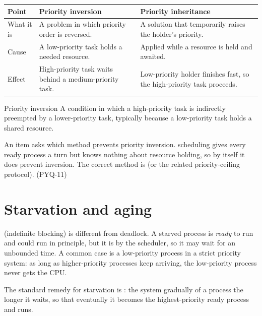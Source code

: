 \begin{center}
\begin{tabular}{p{}p{}p{}}
\toprule
\textbf{Point} & \textbf{Priority inversion} & \textbf{Priority inheritance} \\
\midrule
What it is & A problem in which priority order is reversed. & A solution that temporarily raises the holder's priority. \\
Cause & A low-priority task holds a needed resource. & Applied while a resource is held and awaited. \\
Effect & High-priority task waits behind a medium-priority task. & Low-priority holder finishes fast, so the high-priority task proceeds. \\
\bottomrule
\end{tabular}
\end{center}

\begin{definitionbox}{Priority inversion}
A condition in which a high-priority task is indirectly preempted by a
lower-priority task, typically because a low-priority task holds a shared
resource.
\end{definitionbox}

\begin{example}
An item asks which method prevents priority inversion. 
scheduling gives every ready process a turn but knows nothing about resource
holding, so by itself it does  prevent inversion. The correct method
is  (or the related priority-ceiling protocol).
(PYQ-11)
\end{example}

\section{Starvation and aging}
 (indefinite blocking) is different from deadlock. A starved
process is \emph{ready} to run and could run in principle, but it is
 by the scheduler, so it may wait for an
unbounded time. A common case is a low-priority process in a strict priority
system: as long as higher-priority processes keep arriving, the low-priority
process never gets the CPU.

The standard remedy for starvation is : the system gradually
 of a process the longer it waits, so that eventually
it becomes the highest-priority ready process and runs.

